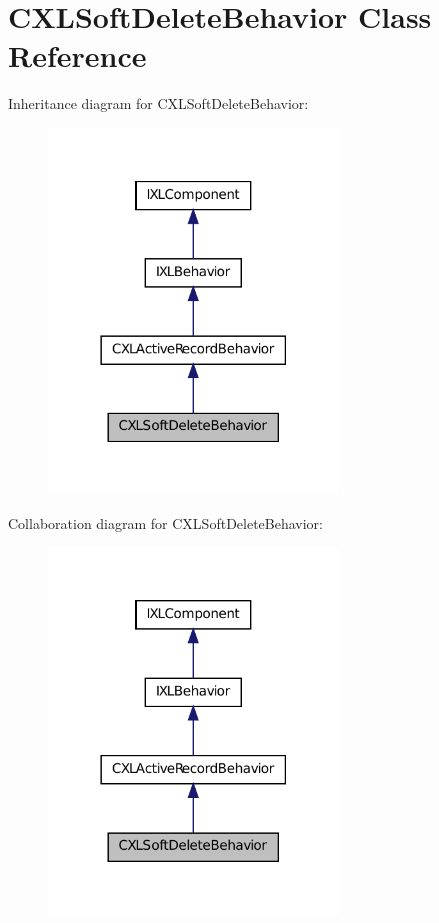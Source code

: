 \hypertarget{classCXLSoftDeleteBehavior}{
\section{CXLSoftDeleteBehavior Class Reference}
\label{classCXLSoftDeleteBehavior}
}


Inheritance diagram for CXLSoftDeleteBehavior:\nopagebreak
\begin{figure}[H]
\begin{center}
\leavevmode
\includegraphics[width=218pt]{classCXLSoftDeleteBehavior__inherit__graph}
\end{center}
\end{figure}


Collaboration diagram for CXLSoftDeleteBehavior:\nopagebreak
\begin{figure}[H]
\begin{center}
\leavevmode
\includegraphics[width=218pt]{classCXLSoftDeleteBehavior__coll__graph}
\end{center}
\end{figure}
